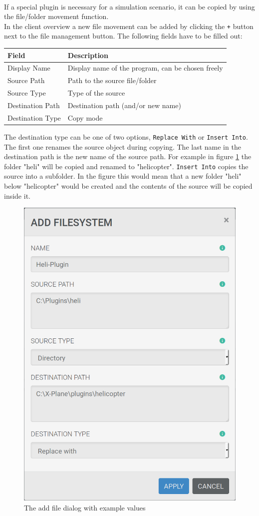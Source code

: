 \documentclass[accentcolor=tud1a, paper=a4, colorback]{tudreport}
\begin{document}
	\\
	If a special plugin is necessary for a simulation scenario, it can be copied by using
	the file/folder movement function.
	\\
	In the client overview a new file movement can be added by clicking the \texttt{+} button
	next to the file management button. The following fields have to be filled out:
	\\
	\begin{center}
	\begin{tabular}{l|l}
		Field & Description \\\hline
		Display Name &  Display name of the program, can be chosen freely\\
		Source Path & Path to the source file/folder\\
		Source Type & Type of the source\\
		Destination Path & Destination path (and/or new name)\\
		Destination Type & Copy mode\\
	\end{tabular}
	\end{center}
	The destination type can be one of two options, \texttt{Replace With} or \texttt{Insert Into}.
	The first one renames the source object during copying. The last name in the destination path
	is the new name of the source path. For example in figure \ref{add_filesystem} the folder 
	"heli" will be copied and renamed to "helicopter".
	\texttt{Insert Into} copies the source into a subfolder. In the figure this would mean that
	a new folder "heli" below "helicopter" would be created and the contents of the source will
	be copied inside it.

	\begin{figure}[H]
		\centering
		\label{add_filesystem}
		\includegraphics[width=.4\textwidth]{add_filesystem}
		\caption{The add file dialog with example values}
	\end{figure}
\end{document}
